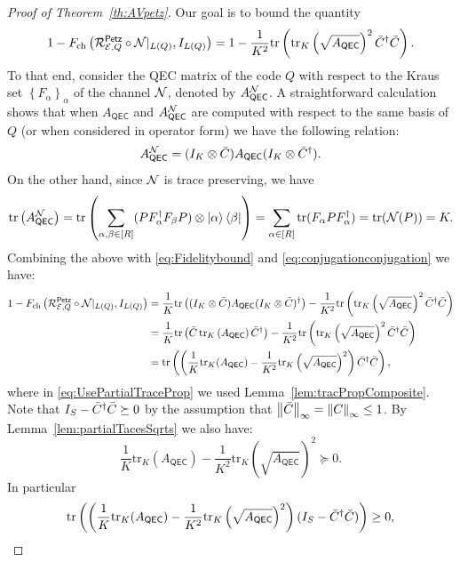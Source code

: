 \documentclass[10pt]{article}
\newcommand{\tr}{\mathrm{tr}}
\newcommand{\p}[1]{\left(#1\right)}
\newcommand{\ppp}[1]{\left\{#1\right\}}
\newcommand{\norm}[1]{\left\|#1\right\|}
\newcommand{\s}[1]{\mathsf{#1}}
\begin{document}
\begin{proof}[Proof of Theorem~\ref{th:AVpetz}]
     Our goal is to bound the quantity 
     \begin{equation}
         1-F_{\mathrm{ch}}\p{\calR_{\calE,Q}^{\s{\s{Petz}}}\circ \calN|_{L(Q)},I_{L(Q)}}=1-\frac{1}{K^2}\tr\p{\tr_K\p{\sqrt{A_{\s{QEC}}}}^2 \Bar{C}^\dag \Bar{C}}.\label{eq:Fidelitybound}
     \end{equation}
     To that end, consider the QEC matrix of the code $Q$ with respect to the Kraus set $\ppp{F_{\alpha}}_\alpha$ of the channel ${\cal N}$, denoted by $A_{\s{QEC}}^{\calN}$. A straightforward calculation shows that when  $A_{\s{QEC}}$ and $A_{\s{QEC}}^{\calN}$ are computed with respect to the same basis of $Q$ (or when considered in operator form) we have the following relation: 
     \[ A_{\s{QEC}}^{\calN}=(I_K\otimes \Bar{C})A_{\s{QEC}}(I_K\otimes \Bar{C}^\dag).\]
     On the other hand, since ${\cal N}$ is trace preserving, we have
     \begin{equation}
         \tr\p{A_{\s{QEC}}^{\calN}}=\tr\p{\sum_{\alpha,\beta \in [R]}(PF_\alpha^\dag F_{\beta}P)\otimes \ket{\alpha}\bra{\beta}}=\sum_{\alpha\in[R]}\tr(F_{\alpha} P F_{\alpha}^\dag)=\tr(\calN(P))=K.\label{eq:conjugationconjugation}
     \end{equation}
     Combining the above with \eqref{eq:Fidelitybound} and \eqref{eq:conjugationconjugation} we have:
     \begin{align}
          1-F_{\mathrm{ch}}\p{\calR_{\calE,Q}^{\s{\s{Petz}}}\circ \calN|_{L(Q)},I_{L(Q)}}&\nonumber=\frac{1}{K}\tr\p{(I_K\otimes \Bar{C})  A_{\s{QEC}}(I_K\otimes \Bar{C})^\dag}-\frac{1}{K^2}\tr\p{\tr_K\p{\sqrt{A_{\s{QEC}}}}^2 \Bar{C}^\dag \Bar{C}}\\
         &=\frac{1}{K}\tr\p{\Bar{C}\,\tr_K\p{A_{\s{QEC}}}\Bar{C}^\dag}-\frac{1}{K^2}\tr\p{\tr_K\p{\sqrt{A_{\s{QEC}}}}^2 \Bar{C}^\dag \Bar{C}}\label{eq:UsePartialTraceProp}\\
         &=\tr\p{\p{\frac{1}{K}\tr_K(A_{\s{QEC}})-\frac{1}{K^2}\tr_K\p{\sqrt{A_{\s{QEC}}}}^2}\Bar{C}^\dag \Bar{C}},\label{eq:AlmostFinalTrace}
     \end{align}
     where in \eqref{eq:UsePartialTraceProp} we used Lemma~\ref{lem:tracPropComposite}. Note that $I_S-\Bar{C}^\dag \Bar{C}\succeq 0$ by the assumption that $\norm{\Bar{C}}_{\infty}=\norm{C}_{\infty}\leq 1$. By Lemma~\ref{lem:partialTacesSqrts} we also have: 
     \[\frac{1}{K}\tr_K(A_{\s{QEC}})-\frac{1}{K^2}\tr_K\p{\sqrt{A_{\s{QEC}}}}^2\succeq 0.\]
     In particular 
          \begin{equation}
              \tr\p{\p{\frac{1}{K}\tr_K(A_{\s{QEC}})-\frac{1}{K^2}\tr_K\p{\sqrt{A_{\s{QEC}}}}^2}(I_S-\Bar{C}^\dag \Bar{C})}\geq 0,\label{eq:prodPOsitivetrace}

\end{equation}
\end{proof}
\end{document}
